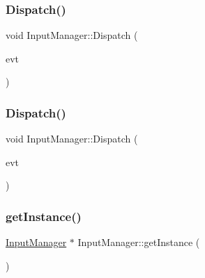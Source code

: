 \subsubsection{\texorpdfstring{Dispatch()}{Dispatch()}\hspace{0.1cm}{\footnotesize\ttfamily [2/3]}}
{\footnotesize\ttfamily void Input\+Manager\+::\+Dispatch (\begin{DoxyParamCaption}\item[{\hyperlink{class_event_listener_a69daf2aeedcab55e1f2c1c178206789e}{Event\+Listener\+::\+Key\+Up\+Event}}]{evt }\end{DoxyParamCaption})}

\hypertarget{class_input_manager_ac0c483ffc6437104b29f2e6f985f07ca}{}\label{class_input_manager_ac0c483ffc6437104b29f2e6f985f07ca} 
\subsubsection{\texorpdfstring{Dispatch()}{Dispatch()}\hspace{0.1cm}{\footnotesize\ttfamily [3/3]}}
{\footnotesize\ttfamily void Input\+Manager\+::\+Dispatch (\begin{DoxyParamCaption}\item[{\hyperlink{class_event_listener_a23add62d02511a54eba0bae8208f9f48}{Event\+Listener\+::\+Generic\+Event}}]{evt }\end{DoxyParamCaption})}

\hypertarget{class_input_manager_a4d4852e7a0451fe53d9c116d8c3100d8}{}\label{class_input_manager_a4d4852e7a0451fe53d9c116d8c3100d8} 
\subsubsection{\texorpdfstring{get\+Instance()}{getInstance()}}
{\footnotesize\ttfamily \hyperlink{class_input_manager}{Input\+Manager} $\ast$ Input\+Manager\+::get\+Instance (\begin{DoxyParamCaption}{ }\end{DoxyParamCaption})\hspace{0.3cm}{\ttfamily [static]}}

\hypertarget{class_input_manager_a0e4ced1e81e16392a445278e92d23ab9}{}\label{class_input_manager_a0e4ced1e81e16392a445278e92d23ab9} 

